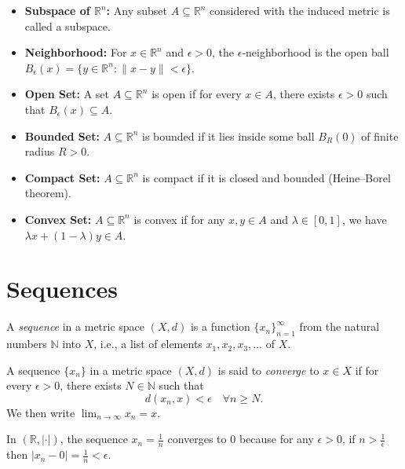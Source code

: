 \begin{itemize}
    \item \textbf{Subspace of $\mathbb{R}^n$:} Any subset $A \subseteq \mathbb{R}^n$ considered with the induced metric is called a subspace.

    \item \textbf{Neighborhood:} For $x \in \mathbb{R}^n$ and $\epsilon > 0$, the $\epsilon$-neighborhood is the open ball $B_\epsilon(x) = \{y \in \mathbb{R}^n : \|x-y\| < \epsilon\}$.

    \item \textbf{Open Set:} A set $A \subseteq \mathbb{R}^n$ is open if for every $x \in A$, there exists $\epsilon > 0$ such that $B_\epsilon(x) \subseteq A$.

    \item \textbf{Bounded Set:} $A \subseteq \mathbb{R}^n$ is bounded if it lies inside some ball $B_R(0)$ of finite radius $R > 0$.

    \item \textbf{Compact Set:} $A \subseteq \mathbb{R}^n$ is compact if it is closed and bounded (Heine–Borel theorem).

    \item \textbf{Convex Set:} $A \subseteq \mathbb{R}^n$ is convex if for any $x,y \in A$ and $\lambda \in [0,1]$, we have $\lambda x + (1-\lambda)y \in A$.
\end{itemize}

\section{Sequences}

\begin{definition}
A \emph{sequence} in a metric space $(X,d)$ is a function $\{x_n\}_{n=1}^\infty$ from the natural numbers $\mathbb{N}$ into $X$, i.e., a list of elements $x_1, x_2, x_3, \dots$ of $X$.
\end{definition}

\begin{definition}
A sequence $\{x_n\}$ in a metric space $(X,d)$ is said to \emph{converge} to $x \in X$ if for every $\epsilon > 0$, there exists $N \in \mathbb{N}$ such that
\[
d(x_n, x) < \epsilon \quad \forall n \geq N.
\]
We then write $\lim_{n \to \infty} x_n = x$.
\end{definition}

\begin{example}
In $(\mathbb{R}, |\cdot|)$, the sequence $x_n = \frac{1}{n}$ converges to $0$ because for any $\epsilon > 0$, if $n > \frac{1}{\epsilon}$ then $|x_n - 0| = \frac{1}{n} < \epsilon$.
\end{example}

